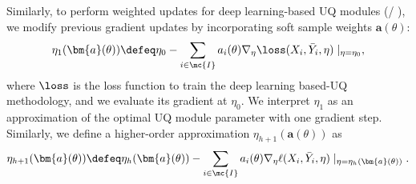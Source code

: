 Similarly, to perform weighted updates for deep learning-based UQ modules (\ensembles/ \ensembleplus), we modify previous gradient updates by incorporating soft sample weights $\bm{a}(\theta)$:
\begin{align*} 
\eta_1(\bm{a}(\theta)) \defeq  \eta_0 - 
\sum_{i \in \mc{I}}  a_i(\theta)   \nabla_{\eta} 
\loss (X_i,\bar{Y}_i,\eta) \mid_{\eta = \eta_0},
\end{align*}  
where $\loss$ is the loss function to train the deep learning based-UQ methodology, 
and we evaluate its gradient    at $\eta_0$. 
We interpret $\eta_1$ as an approximation of the optimal UQ module parameter with one gradient step.
Similarly, we define
a higher-order approximation $\eta_{h+1}(\bm{a}(\theta))$  as
\begin{align}
    \eta_{h+1} (\bm{a}(\theta)) \defeq  \eta_h (\bm{a}(\theta)) - 
    \sum_{i \in \mc{I}}  a_i(\theta)   \nabla_{\eta} \ell(X_i,\bar{Y}_i,\eta)\mid_{\eta = \eta_h(\bm{a}(\theta))}. \label{eqn:higher-eta-update}
\end{align}

 




 



